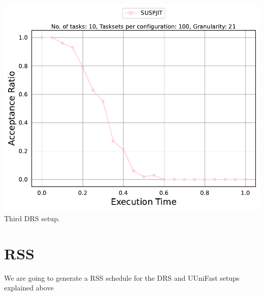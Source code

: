 \documentclass[]{article}
\begin{document}
\begin{minipage}[t]{0.48\linewidth}
		\includegraphics[width=\linewidth]{SUSPJIT_3rdSetup.pdf}
		Third DRS setup.
		\vspace{0.3cm}
	\end{minipage}

	\clearpage
	\section{RSS}
{
\raggedleft We are going to generate a RSS schedule for the DRS and UUniFast setups explained above \newline
}
\end{document}
